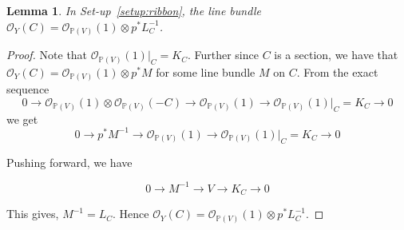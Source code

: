 \documentclass[11pt,twoside]{amsart}
\theoremstyle{plain}
\newtheorem{lemma}[theorem]{Lemma}
\theoremstyle{definition}
\newtheorem{definition}[theorem]{Definition}
\newcommand{\PP}{\mathbb{P}}
\newcommand{\OO}{\mathcal{O}}
\newcommand{\Ct}{\widetilde{C}}
\begin{document}



\begin{lemma}\label{lem:OSC}
In Set-up~\ref{setup:ribbon}, the line bundle $\OO_Y(C)=\OO_{\PP(V)}(1)\otimes p^*L_C^{-1}$. 


\end{lemma}

\begin{proof}
Note that $\mathcal{O}_{\mathbb{P}(V)}(1)|_C = K_C$. Further since $C$ is a section, we have that $\mathcal{O}_Y(C) = \mathcal{O}_{\mathbb{P}(V)}(1) \otimes p^*M$ for some line bundle $M$ on $C$. From the exact sequence
$$0 \to \mathcal{O}_{\mathbb{P}(V)}(1) \otimes \mathcal{O}_{\mathbb{P}(V)}(-C) \to \mathcal{O}_{\mathbb{P}(V)}(1) \to \mathcal{O}_{\mathbb{P}(V)}(1)|_C = K_C \to 0$$
we get 
$$0 \to p^*M^{-1} \to \mathcal{O}_{\mathbb{P}(V)}(1) \to \mathcal{O}_{\mathbb{P}(V)}(1)|_C = K_C \to 0$$

Pushing forward, we have 

$$0 \to M^{-1} \to V \to K_C \to 0$$

This gives, $M^{-1} = L_C$. Hence $\mathcal{O}_Y(C) = \mathcal{O}_{\mathbb{P}(V)}(1) \otimes p^*L_C^{-1}$.



\end{proof}
\end{document}
